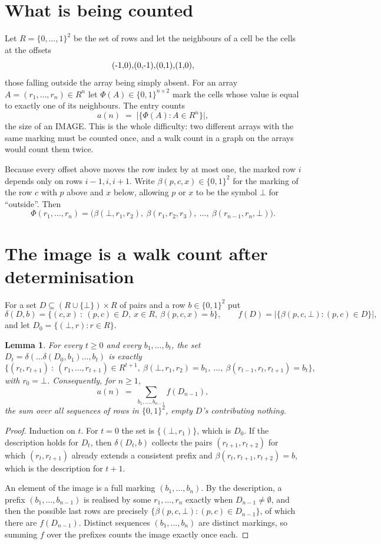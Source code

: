 \documentclass[11pt,a4paper]{article}
\theoremstyle{plain}
\newtheorem{lemma}[theorem]{Lemma}
\theoremstyle{definition}
\begin{document}
\section{What is being counted}

Let $R=\{0,\dots,1\}^{2}$ be the set of rows and let the neighbours of a cell be the
cells at the offsets
\[
$(-1,0)$, $(0,-1)$, $(0,1)$, $(1,0)$,
\]
those falling outside the array being simply absent. For an array
$A=(r_1,\dots,r_n)\in R^n$ let $\Phi(A)\in\{0,1\}^{n\times2}$ mark the cells whose value
is equal to exactly one of its neighbours. The entry counts
\[
a(n)\;=\;\bigl|\{\Phi(A):A\in R^n\}\bigr| ,
\]
the size of an IMAGE. This is the whole difficulty: two different arrays with the same marking
must be counted once, and a walk count in a graph on the arrays would count them twice.

Because every offset above moves the row index by at most one, the marked row $i$ depends only
on rows $i-1,i,i+1$. Write $\beta(p,c,x)\in\{0,1\}^{2}$ for the marking of the row $c$
with $p$ above and $x$ below, allowing $p$ or $x$ to be the symbol $\bot$ for ``outside''.
Then
\[
\Phi(r_1,\dots,r_n)=\bigl(\beta(\bot,r_1,r_2),\ \beta(r_1,r_2,r_3),\ \dots,\
\beta(r_{n-1},r_n,\bot)\bigr).
\]

\section{The image is a walk count after determinisation}

For a set $D\subseteq(R\cup\{\bot\})\times R$ of pairs and a row $b\in\{0,1\}^{2}$ put
\[
\delta(D,b)=\{(c,x)\ :\ (p,c)\in D,\ x\in R,\ \beta(p,c,x)=b\},\qquad
f(D)=\bigl|\{\beta(p,c,\bot):(p,c)\in D\}\bigr| ,
\]
and let $D_0=\{(\bot,r):r\in R\}$.

\begin{lemma}\label{lem:det}
For every $t\ge0$ and every $b_1,\dots,b_t$, the set
$D_t=\delta(\dots\delta(D_0,b_1)\dots,b_t)$ is exactly
\[
\{(r_t,r_{t+1})\ :\ (r_1,\dots,r_{t+1})\in R^{t+1},\ \beta(\bot,r_1,r_2)=b_1,\ \dots,\
\beta(r_{t-1},r_t,r_{t+1})=b_t\} ,
\]
with $r_0=\bot$. Consequently, for $n\ge1$,
\[
a(n)\;=\;\sum_{b_1,\dots,b_{n-1}}f(D_{n-1}),
\]
the sum over all sequences of rows in $\{0,1\}^{2}$, empty $D$'s contributing nothing.
\end{lemma}

\begin{proof}
Induction on $t$. For $t=0$ the set is $\{(\bot,r_1)\}$, which is $D_0$. If the description
holds for $D_t$, then $\delta(D_t,b)$ collects the pairs $(r_{t+1},r_{t+2})$ for which
$(r_t,r_{t+1})$ already extends a consistent prefix and
$\beta(r_t,r_{t+1},r_{t+2})=b$, which is the description for $t+1$.

An element of the image is a full marking $(b_1,\dots,b_n)$. By the description, a prefix
$(b_1,\dots,b_{n-1})$ is realised by some $r_1,\dots,r_n$ exactly when $D_{n-1}\neq
\emptyset$, and then the possible last rows are precisely
$\{\beta(p,c,\bot):(p,c)\in D_{n-1}\}$, of which there are $f(D_{n-1})$. Distinct
sequences $(b_1,\dots,b_n)$ are distinct markings, so summing $f$ over the prefixes counts the
image exactly once each.
\end{proof}
\end{document}
